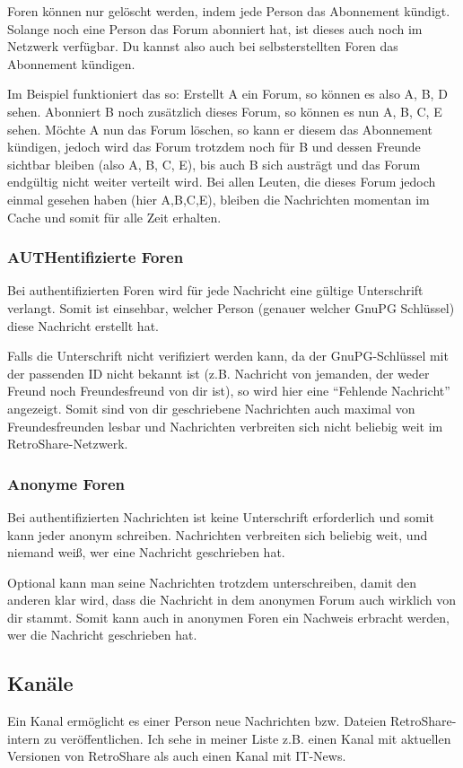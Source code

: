 Foren können nur gelöscht werden, indem jede Person das Abonnement kündigt. Solange noch eine Person das Forum abonniert hat, ist dieses auch noch im Netzwerk verfügbar. Du kannst also auch bei selbsterstellten Foren das Abonnement kündigen.

Im Beispiel funktioniert das so: Erstellt A ein Forum, so können es also A, B, D sehen. Abonniert B noch zusätzlich dieses Forum, so können es nun A, B, C, E sehen. Möchte A nun das Forum löschen, so kann er diesem das Abonnement kündigen, jedoch wird das Forum trotzdem noch für B und dessen Freunde sichtbar bleiben (also A, B, C, E), bis auch B sich austrägt und das Forum endgültig nicht weiter verteilt wird. Bei allen Leuten, die dieses Forum jedoch einmal gesehen haben (hier A,B,C,E), bleiben die Nachrichten momentan im Cache und somit für alle Zeit erhalten.

\subsubsection{AUTHentifizierte Foren}
Bei authentifizierten Foren wird für jede Nachricht eine gültige Unterschrift verlangt. Somit ist einsehbar, welcher Person (genauer welcher GnuPG Schlüssel) diese Nachricht erstellt hat.

Falls die Unterschrift nicht verifiziert werden kann, da der GnuPG-Schlüssel mit der passenden ID nicht bekannt ist (z.B. Nachricht von jemanden, der weder Freund noch Freundesfreund von dir ist), so wird hier eine ``Fehlende Nachricht'' angezeigt. Somit sind von dir geschriebene Nachrichten auch maximal von Freundesfreunden lesbar und Nachrichten verbreiten sich nicht beliebig weit im RetroShare-Netzwerk.

\subsubsection{Anonyme Foren}
Bei authentifizierten Nachrichten ist keine Unterschrift erforderlich und somit kann jeder anonym schreiben. Nachrichten verbreiten sich beliebig weit, und niemand weiß, wer eine Nachricht geschrieben hat.

Optional kann man seine Nachrichten trotzdem unterschreiben, damit den anderen klar wird, dass die Nachricht in dem anonymen Forum auch wirklich von dir stammt. Somit kann auch in anonymen Foren ein Nachweis erbracht werden, wer die Nachricht geschrieben hat.

\subsection{Kanäle}
Ein Kanal ermöglicht es einer Person neue Nachrichten bzw. Dateien RetroShare-intern zu veröffentlichen. Ich sehe in meiner Liste z.B. einen Kanal mit aktuellen Versionen von RetroShare als auch einen Kanal mit IT-News.

